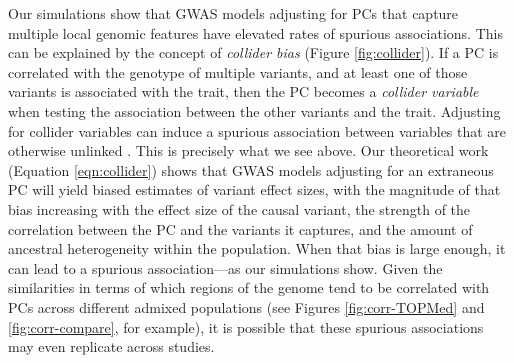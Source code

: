 \documentclass[12pt]{article}
\newcommand{\add}[1]{{\color{red}{[... #1 ...]}}}
\begin{document}
Our simulations show that GWAS models adjusting for PCs that capture multiple local genomic features have elevated rates of spurious associations. %
This can be explained by the concept of \textit{collider bias} (Figure \ref{fig:collider}).
If a PC is correlated with the genotype of multiple variants, and at least one of those variants is associated with the trait, then the PC becomes a \textit{collider variable} when testing the association between the other variants and the trait.
Adjusting for collider variables can induce a spurious association between variables that are otherwise unlinked \citep{elwert2014}.
This is precisely what we see above.
Our theoretical work (Equation \ref{eqn:collider}) shows that GWAS models adjusting for an extraneous PC will yield biased estimates of variant effect sizes, with the magnitude of that bias increasing with the effect size of the causal variant, the strength of the correlation between the PC and the variants it captures, and the amount of ancestral heterogeneity within the population.
When that bias is large enough, it can lead to a spurious association---as our simulations show.
Given the similarities in terms of which regions of the genome tend to be correlated with PCs across different admixed populations (see Figures \ref{fig:corr-TOPMed} and \ref{fig:corr-compare}, for example), it is possible that these spurious associations may even replicate across studies.  

\end{document}
